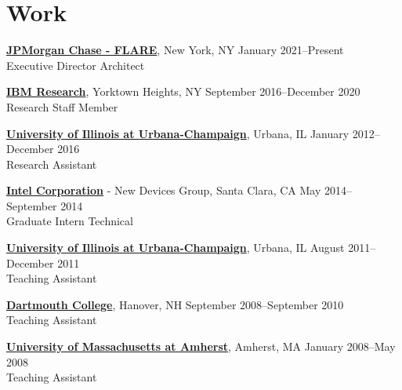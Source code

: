 
\section{\sc Work}
{\href{https://www.jpmorgan.com/insights/technology/flare}{\bf JPMorgan Chase - FLARE}}, New York, NY \hfill January 2021--Present\\
Executive Director Architect
\vspace{-0.16cm}

{\href{http://research.ibm.com/labs/watson/index.shtml}{\bf IBM Research}}, Yorktown Heights, NY \hfill September 2016--December 2020\\
Research Staff Member
\vspace{-0.16cm}

{\href{http://www.illinois.edu/}{{\bf University of Illinois at Urbana-Champaign}}}, Urbana, IL \hfill January 2012--December 2016\\
Research Assistant
\vspace{-0.16cm}

{\href{http://www.intel.com/}{{\bf Intel Corporation}}} - New Devices Group, Santa Clara, CA \hfill May 2014--September 2014\\
Graduate Intern Technical
\vspace{-0.16cm}

{\href{http://www.illinois.edu/}{{\bf University of Illinois at Urbana-Champaign}}}, Urbana, IL \hfill August 2011--December 2011\\
Teaching Assistant
\vspace{-0.16cm}

{\href{http://www.dartmouth.edu/}{{\bf Dartmouth College}}}, Hanover, NH \hfill September 2008--September 2010\\
Teaching Assistant
\vspace{-0.16cm}

{\href{http://www.umass.edu/}{{\bf University of Massachusetts at Amherst}}}, Amherst, MA \hfill January 2008--May 2008\\
Teaching Assistant
